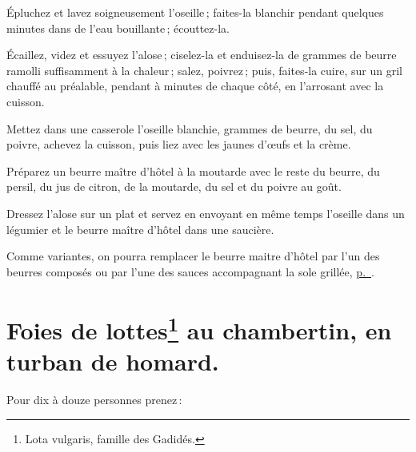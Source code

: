 Épluchez et lavez soigneusement l’oseille ; faites-la blanchir pendant quelques
minutes dans de l'eau bouillante ; écouttez-la.

Écaillez, videz et essuyez l'alose ; ciselez-la et enduisez-la de {\mmm}
grammes de beurre ramolli suffisamment à la chaleur ; salez, poivrez ; puis,
faites-la cuire, sur un gril chauffé au préalable, pendant {\mmm}
à {\mmm} minutes de chaque côté, en l'arrosant avec la cuisson.

Mettez dans une casserole l'oseille blanchie, {\mmm} grammes de beurre,
du sel, du poivre, achevez la cuisson, puis liez avec les jaunes d'œufs et la
crème.

Préparez un beurre maître d'hôtel à la moutarde avec le reste du beurre, du
persil, du jus de citron, de la moutarde, du sel et du poivre au goût.

Dressez l'alose sur un plat et servez en envoyant en même temps l'oseille dans
un légumier et le beurre maître d'hôtel dans une saucière.

Comme variantes, on pourra remplacer le beurre maitre d'hôtel par l'un des
beurres composés ou par l'une des sauces accompagnant la sole grillée,
\hyperlink{p0355}{p. \pageref{pg0355}}.

\section*{\centering Foies de lottes\footnote{Lota vulgaris, famille des Gadidés.} au chambertin, en turban de homard.}

Pour dix à douze personnes prenez :

\medskip

